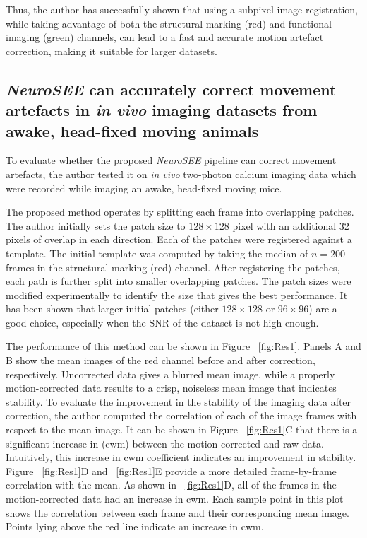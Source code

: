 Thus, the author has successfully shown that using a subpixel image registration, while taking advantage of both the structural marking (red) and functional imaging (green) channels, can lead to a fast and accurate motion artefact correction, making it suitable for larger datasets. 

\subsection{\textit{NeuroSEE} can accurately correct movement artefacts in \textit{in vivo} imaging datasets from awake, head-fixed moving animals}
\hspace{\parindent} To evaluate whether the proposed \textit{NeuroSEE} pipeline can correct movement artefacts, the author tested it on \textit{in vivo} two-photon calcium imaging data which were recorded while imaging an awake, head-fixed moving mice. 

The proposed method operates by splitting each frame into overlapping patches. The author initially sets the patch size to $128 \times 128$ pixel with an additional 32 pixels of overlap in each direction. Each of the patches were registered against a template. The initial template was computed by taking the median of $n=200$ frames in the structural marking (red) channel. After registering the patches, each path is further split into smaller overlapping patches. The patch sizes were modified experimentally to identify the size that gives the best performance. It has been shown that larger initial patches (either $128 \times 128$ or $96 \times 96$) are a good choice, especially when the SNR of the dataset is not high enough. 

The performance of this method can be shown in Figure ~\ref{fig:Res1}. Panels A and B show the mean images of the red channel before and after correction, respectively. Uncorrected data gives a blurred mean image, while a properly motion-corrected data results to a crisp, noiseless mean image that indicates stability. To evaluate the improvement in the stability of the imaging data after correction, the author computed the correlation of each of the image frames with respect to the mean image. It can be shown in Figure ~\ref{fig:Res1}C that there is a significant increase in (\ac{cwm}) between the motion-corrected and raw data. Intuitively, this increase in \ac{cwm} coefficient indicates an improvement in stability. Figure ~\ref{fig:Res1}D and ~\ref{fig:Res1}E provide a more detailed frame-by-frame correlation with the mean. As shown in ~\ref{fig:Res1}D, all of the frames in the motion-corrected data had an increase in \ac{cwm}. Each sample point in this plot shows the correlation between each frame and their corresponding mean image. Points lying above the red line indicate an increase in \ac{cwm}.

